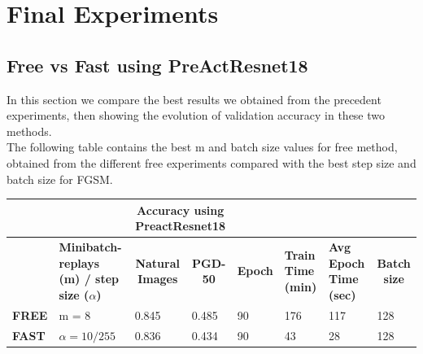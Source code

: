 \documentclass{article}
\begin{document}
\section{Final Experiments}
\subsection{Free vs Fast using PreActResnet18}
In this section we compare the best results we obtained from the precedent
experiments, then showing the evolution of validation accuracy in these two
methods. \\
The following table contains the best m and batch size values for free method,
obtained from the different free experiments compared with the best step size
and batch size for FGSM. 
\begin{table}[hbt!]
\begin{tabular}{|l|p{2.1cm}|c|l|l|l|l|l|}
\hline
              & \multicolumn{1}{l|}{}         &
              \multicolumn{2}{c|}{\textbf{Accuracy using PreactResnet18}}
              & \multicolumn{3}{l|}{\textbf{}}
              & \textbf{}                                \\ \hline
 & \textbf{Minibatch-replays (m) / step size ($\alpha$)} & \textbf{Natural
 Images}                      & \multicolumn{1}{c|}{\textbf{PGD-50}} &
 \multicolumn{1}{c|}{\textbf{Epoch}} & \multicolumn{1}{p{1cm}|}{\textbf{Train
 Time (min)}} & \multicolumn{1}{p{1cm}|}{\textbf{Avg Epoch Time (sec)}} &
 \multicolumn{1}{c|}{\textbf{Batch size}} \\ \hline
\textbf{FREE} & m = 8 & \multicolumn{1}{l|}{0.845} & { 0.485}         & { 90}
& { 176}                     & { 117}                         & { 128}
\\ \hline
\textbf{FAST} & $\alpha = 10/255$       & \multicolumn{1}{l|}{0.836} & { 0.434}
& { 90}           & { 43}                     & { 28}                         &
{ 128}               \\ \hline
\end{tabular}
\end{table}
\end{document}

